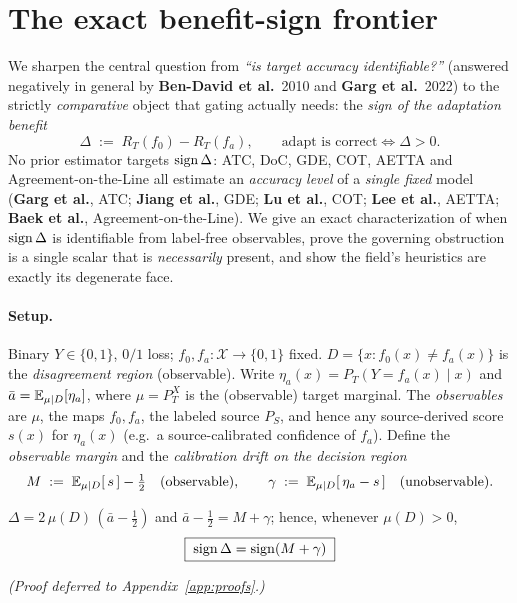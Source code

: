 \section{The exact benefit-sign frontier}\label{sec:bsfrontier}

We sharpen the central question from \emph{``is target accuracy identifiable?''}
(answered negatively in general by \textbf{Ben-David et al.}\ 2010 and \textbf{Garg et al.}\ 2022) to the
strictly \emph{comparative} object that gating actually needs: the \emph{sign of the
adaptation benefit}
\[
  \Delta \;:=\; R_T(f_0)-R_T(f_a),\qquad \text{adapt is correct}\iff \Delta>0 .
\]
No prior estimator targets $\operatorname{sign}\Delta$: ATC, DoC, GDE, COT, AETTA and
Agreement-on-the-Line all estimate an \emph{accuracy level} of a \emph{single fixed}
model (\textbf{Garg et al.}, ATC; \textbf{Jiang et al.}, GDE; \textbf{Lu et al.}, COT;
\textbf{Lee et al.}, AETTA; \textbf{Baek et al.}, Agreement-on-the-Line).
We give an exact characterization of when $\operatorname{sign}\Delta$ is identifiable from label-free
observables, prove the governing obstruction is a single scalar that is \emph{necessarily}
present, and show the field's heuristics are exactly its degenerate face.

\paragraph{Setup.} Binary $Y\in\{0,1\}$, $0/1$ loss; $f_0,f_a:\mathcal X\to\{0,1\}$ fixed.
$D=\{x:f_0(x)\neq f_a(x)\}$ is the \emph{disagreement region} (observable). Write
$\eta_a(x)=P_T(Y=f_a(x)\mid x)$ and $\bar a=\mathbb{E}_{\mu\mid D}[\eta_a]$, where $\mu=P_T^X$ is
the (observable) target marginal. The \emph{observables} are $\mu$, the maps $f_0,f_a$, the
labeled source $P_S$, and hence any source-derived score $s(x)$ for $\eta_a(x)$ (e.g.\ a
source-calibrated confidence of $f_a$). Define the \emph{observable margin} and the
\emph{calibration drift on the decision region}
\[
  M \;:=\; \mathbb{E}_{\mu\mid D}[\,s\,]-\tfrac12 \quad(\text{observable}),
  \qquad
  \gamma \;:=\; \mathbb{E}_{\mu\mid D}[\,\eta_a-s\,]\quad(\text{unobservable}).
\]

\begin{lemma}[Reduction]\label{lem:reduction}
$\Delta = 2\,\mu(D)\,(\bar a-\tfrac12)$ and $\bar a-\tfrac12 = M+\gamma$; hence, whenever
$\mu(D)>0$,
\[
  \boxed{\;\operatorname{sign}\Delta=\operatorname{sign}(M+\gamma)\;}
\]
\end{lemma}
\emph{(Proof deferred to Appendix~\ref{app:proofs}.)}

